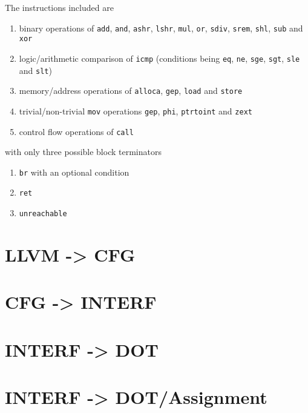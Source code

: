 \documentclass{article}
\begin{document}
The instructions included are
\begin{enumerate}
    \item binary operations of \lstinline!add!, \lstinline!and!, \lstinline!ashr!, \lstinline!lshr!, \lstinline!mul!, \lstinline!or!, \lstinline!sdiv!, \lstinline!srem!, \lstinline!shl!, \lstinline!sub! and \lstinline!xor!
    \item logic/arithmetic comparison of \lstinline!icmp! (conditions being \lstinline!eq!, \lstinline!ne!, \lstinline!sge!, \lstinline!sgt!, \lstinline!sle! and \lstinline!slt!)
    \item memory/address operations of \lstinline!alloca!, \lstinline!gep!, \lstinline!load! and \lstinline!store!
    \item trivial/non-trivial \lstinline!mov! operations \lstinline!gep!, \lstinline!phi!, \lstinline!ptrtoint! and \lstinline!zext!
    \item control flow operations of \lstinline!call!
\end{enumerate}
with only three possible block terminators 
\begin{enumerate}
    \item \lstinline!br! with an optional condition
    \item \lstinline!ret!
    \item \lstinline!unreachable!
\end{enumerate}



\section{LLVM -> CFG}


\section{CFG -> INTERF}

%

\section{INTERF -> DOT}


\section{INTERF -> DOT/Assignment}
\end{document}
